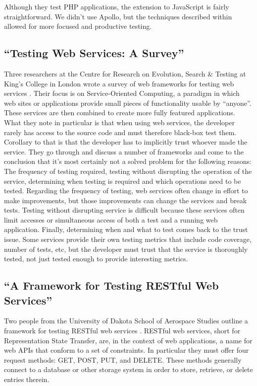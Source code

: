 \documentclass[12pt]{ucthesis}
\begin{document}
Although they test PHP applications, the extension to JavaScript is fairly straightforward. We didn't use Apollo, but the techniques described within allowed for more focused and productive testing.

\subsection{``Testing Web Services: A Survey''}
Three researchers at the Centre for Research on Evolution, Search \& Testing at King's College in London wrote a survey of web frameworks for testing web services \cite{TestingWebServicesSurvey}. Their focus is on Service-Oriented Computing, a paradigm in which web sites or applications provide small pieces of functionality usable by ``anyone''. These services are then combined to create more fully featured applications. What they note in particular is that when using web services, the developer rarely has access to the source code and must therefore black-box test them. Corollary to that is that the developer has to implicitly trust whoever made the service. They go through and discuss a number of frameworks and come to the conclusion that it's most certainly not a solved problem for the following reasons: The frequency of testing required, testing without disrupting the operation of the service, determining when testing is required and which operations need to be tested. Regarding the frequency of testing, web services often change in effort to make improvements, but those improvements can change the services and break tests. Testing without disrupting service is difficult because these services often limit accesses or simultaneous access of both a test and a running web application. Finally, determining when and what to test comes back to the trust issue. Some services provide their own testing metrics that include code coverage, number of tests, etc, but the developer must trust that the service is thoroughly tested, not just tested enough to provide interesting metrics.

\subsection{``A Framework for Testing RESTful Web Services''}
Two people from the University of Dakota School of Aerospace Studies outline a framework for testing RESTful web services \cite{RESTfulFramework}. RESTful web services, short for Representation State Transfer, are, in the context of web applications, a name for web APIs that conform to a set of constraints. In particular they must offer four request methods: GET, POST, PUT, and DELETE. These methods generally connect to a database or other storage system in order to store, retrieve, or delete entries therein.
\end{document}
